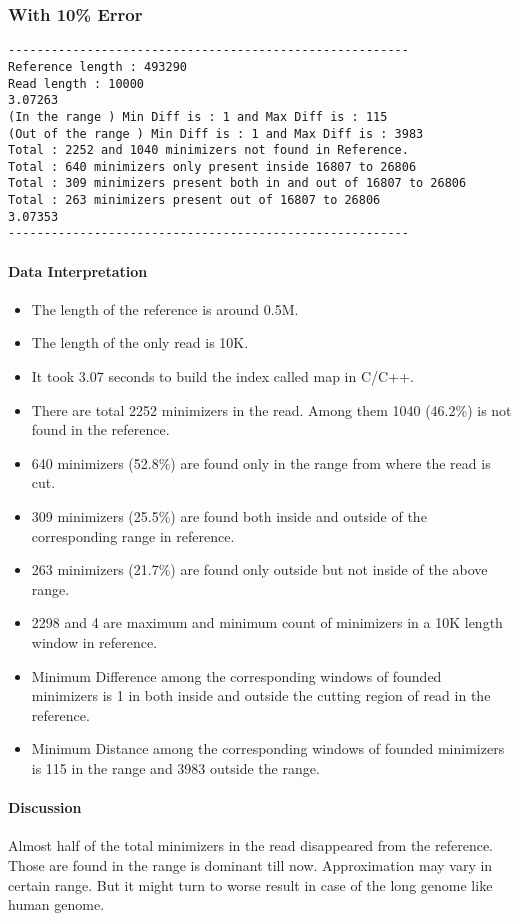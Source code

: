\documentclass{standalone}
\begin{document}
\subsubsection*{With 10\% Error}
\begin{verbatim}
--------------------------------------------------------
Reference length : 493290
Read length : 10000
3.07263
(In the range ) Min Diff is : 1 and Max Diff is : 115
(Out of the range ) Min Diff is : 1 and Max Diff is : 3983
Total : 2252 and 1040 minimizers not found in Reference.
Total : 640 minimizers only present inside 16807 to 26806
Total : 309 minimizers present both in and out of 16807 to 26806
Total : 263 minimizers present out of 16807 to 26806
3.07353
--------------------------------------------------------
\end{verbatim}
\paragraph*{Data Interpretation}
\begin{itemize}
	\item The length of the reference is around 0.5M.
	\item The length of the only read is 10K.
	\item It took 3.07 seconds to build the index called map in C/C++.
	\item There are total 2252 minimizers in the read. Among them 1040 (46.2\%) is not found in the reference.
	\item 640 minimizers (52.8\%) are found only in the range from where the read is cut.
	\item 309 minimizers (25.5\%) are found both inside and outside of the corresponding range in reference.
	\item 263 minimizers (21.7\%) are found only outside but not inside of the above range.
	\item 2298 and 4 are maximum and minimum count of minimizers in a 10K length window in reference.
	\item Minimum Difference among the corresponding windows of founded minimizers is 1 in both inside and outside the cutting region of read in the reference.
	\item  Minimum Distance among the corresponding windows of founded minimizers is 115 in the range and 3983 outside the range.
\end{itemize}
\paragraph*{Discussion}
Almost half of the total minimizers in the read disappeared from the reference. Those are found in the range is dominant till now. Approximation may vary in certain range. But it might turn to worse result in case of the long genome like human genome.
\end{document}

